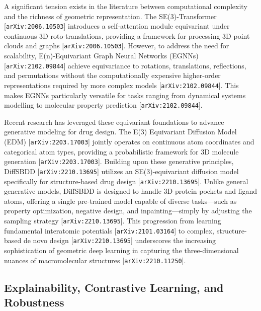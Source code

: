 \documentclass[11pt]{article}
\begin{document}
A significant tension exists in the literature between computational complexity and the richness of geometric representation. The SE(3)-Transformer [\texttt{arXiv:2006.10503}] introduces a self-attention module equivariant under continuous 3D roto-translations, providing a framework for processing 3D point clouds and graphs [\texttt{arXiv:2006.10503}]. However, to address the need for scalability, E(n)-Equivariant Graph Neural Networks (EGNNs) [\texttt{arXiv:2102.09844}] achieve equivariance to rotations, translations, reflections, and permutations without the computationally expensive higher-order representations required by more complex models [\texttt{arXiv:2102.09844}]. This makes EGNNs particularly versatile for tasks ranging from dynamical systems modelling to molecular property prediction [\texttt{arXiv:2102.09844}].

Recent research has leveraged these equivariant foundations to advance generative modeling for drug design. The E(3) Equivariant Diffusion Model (EDM) [\texttt{arXiv:2203.17003}] jointly operates on continuous atom coordinates and categorical atom types, providing a probabilistic framework for 3D molecule generation [\texttt{arXiv:2203.17003}]. Building upon these generative principles, DiffSBDD [\texttt{arXiv:2210.13695}] utilizes an SE(3)-equivariant diffusion model specifically for structure-based drug design [\texttt{arXiv:2210.13695}]. Unlike general generative models, DiffSBDD is designed to handle 3D protein pockets and ligand atoms, offering a single pre-trained model capable of diverse tasks—such as property optimization, negative design, and inpainting—simply by adjusting the sampling strategy [\texttt{arXiv:2210.13695}]. This progression from learning fundamental interatomic potentials [\texttt{arXiv:2101.03164}] to complex, structure-based de novo design [\texttt{arXiv:2210.13695}] underscores the increasing sophistication of geometric deep learning in capturing the three-dimensional nuances of macromolecular structures [\texttt{arXiv:2210.11250}].

\subsection{Explainability, Contrastive Learning, and Robustness}
\end{document}
